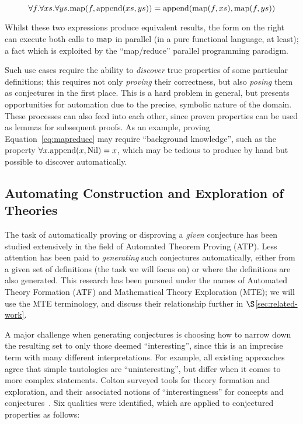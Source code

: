 \begin{equation} \label{eq:mapreduce}
  \forall f. \forall xs. \forall ys.
    \text{map}(f, \text{append}(xs, ys)) = \text{append}(\text{map}(f, xs), \text{map}(f, ys))
\end{equation}

Whilst these two expressions produce equivalent results, the form on the right
can execute both calls to $\text{map}$ in parallel (in a pure functional language, at
least); a fact which is exploited by the ``map/reduce'' parallel programming
paradigm.

Such use cases require the ability to \emph{discover} true properties of some
particular definitions; this requires not only \emph{proving} their correctness,
but also \emph{posing} them as conjectures in the first place. This is a hard
problem in general, but presents opportunities for automation due to the
precise, symbolic nature of the domain. These processes can also feed into each
other, since proven properties can be used as lemmas for subsequent proofs. As
an example, proving Equation~\ref{eq:mapreduce} may require ``background
knowledge'', such as the property $\forall x. \text{append}(x, \text{Nil}) = x$, which may
be tedious to produce by hand but possible to discover automatically.

\subsection{Automating Construction and Exploration of Theories}
\label{sec:te}

The task of automatically proving or disproving a \emph{given} conjecture has
been studied extensively in the field of Automated Theorem Proving (ATP). Less
attention has been paid to \emph{generating} such conjectures automatically,
either from a given set of definitions (the task we will focus on) or where the
definitions are also generated. This research has been pursued under the names
of Automated Theory Formation (ATF) and Mathematical Theory Exploration (MTE);
we will use the MTE terminology, and discuss their relationship further in
$\S$\ref{sec:related-work}.

A major challenge when generating conjectures is choosing how to narrow down the
resulting set to only those deemed ``interesting'', since this is an imprecise
term with many different interpretations. For example, all existing approaches
agree that simple tautologies are ``uninteresting'', but differ when it comes to
more complex statements.  Colton \etal{} surveyed tools for theory formation
and exploration, and their associated notions of ``interestingness'' for
concepts and conjectures~\cite{colton2000notion}. Six qualities were identified,
which are applied to conjectured properties as follows:

